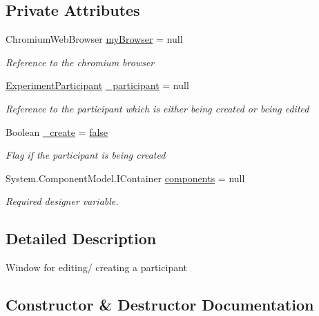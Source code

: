 \subsection*{Private Attributes}
\begin{DoxyCompactItemize}
\item 
Chromium\+Web\+Browser \hyperlink{class_web_analyzer_1_1_u_i_1_1_edit_participant_form_a6d84e654a3d464fcd61e2b6c4f96956e}{my\+Browser} = null
\begin{DoxyCompactList}\small\item\em Reference to the chromium browser \end{DoxyCompactList}\item 
\hyperlink{class_web_analyzer_1_1_models_1_1_base_1_1_experiment_participant}{Experiment\+Participant} \hyperlink{class_web_analyzer_1_1_u_i_1_1_edit_participant_form_aac5162a2c1f8dbf642ac8657b1945492}{\+\_\+participant} = null
\begin{DoxyCompactList}\small\item\em Reference to the participant which is either being created or being edited \end{DoxyCompactList}\item 
Boolean \hyperlink{class_web_analyzer_1_1_u_i_1_1_edit_participant_form_a8ae6585b2db317e6f36b81c9e838b253}{\+\_\+create} = \hyperlink{_u_i_2_h_t_m_l_resources_2js_2src_2export_8js_ae6c865df784842196d411c1466b01686}{false}
\begin{DoxyCompactList}\small\item\em Flag if the participant is being created \end{DoxyCompactList}\item 
System.\+Component\+Model.\+I\+Container \hyperlink{class_web_analyzer_1_1_u_i_1_1_edit_participant_form_a4f0de47592baefdf0d9bb214dd0aa562}{components} = null
\begin{DoxyCompactList}\small\item\em Required designer variable. \end{DoxyCompactList}\end{DoxyCompactItemize}


\subsection{Detailed Description}
Window for editing/ creating a participant 



\subsection{Constructor \& Destructor Documentation}
\hypertarget{class_web_analyzer_1_1_u_i_1_1_edit_participant_form_a5b988532c5dfa542239ee3ba825193d6}{}
